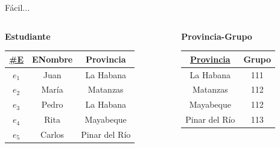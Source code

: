 \begin{frame}{F\'acil...}
    \begin{columns}[T]
        \begin{column}{0.68\linewidth}
            \begin{columns}[T]
                \begin{column}{0.6\textwidth}
                    \begin{center}
                        \textbf{Estudiante}\\[2mm]
        
                        \begin{tabular}{ccc}
                            \underline{\#E} & ENombre & Provincia\\[1mm]
                            \hline
                            $e_1$ & Juan & La Habana\\
                            $e_2$ & Mar\'ia & Matanzas\\
                            $e_3$ & Pedro & La Habana\\
                            $e_4$ & Rita & Mayabeque\\
                            $e_5$ & Carlos & Pinar del R\'io
                        \end{tabular}
                    \end{center}
                \end{column}

                \begin{column}{0.4\textwidth}
                    \begin{center}
                        \textbf{Provincia-Grupo}\\[2mm]
        
                        \begin{tabular}{cc}
                            \underline{Provincia} & Grupo\\[1mm]
                            \hline
                            La Habana & 111\\
                            Matanzas & 112 \\
                            Mayabeque & 112 \\
                            Pinar del R\'io & 113
                            
                        \end{tabular}
                    \end{center}
                \end{column}
                

\end{columns}
\end{column}
\end{columns}
\end{frame}
